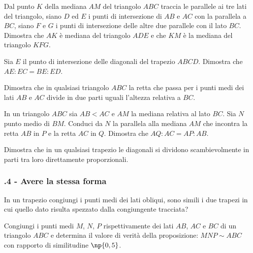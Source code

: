 \begin{multicols}{2}
\begin{esercizio}
\label{ese:6.46}
Dal punto $K$ della mediana $AM$ del triangolo $ABC$ traccia le parallele ai tre lati del triangolo, siano $D$ ed $E$ i punti di intersezione di $AB$ e $AC$ con la parallela a $BC$, siano $F$ e $G$ i punti di intersezione delle altre due parallele con il lato $BC$. Dimostra che $AK$ è mediana del triangolo $ADE$ e che $KM$ è la mediana del triangolo $KFG$.
\end{esercizio}

\begin{esercizio}
\label{ese:6.47}
Sia $E$ il punto di intersezione delle diagonali del trapezio $ABCD$. Dimostra che $AE : EC = BE : ED$.
\end{esercizio}

\begin{esercizio}
\label{ese:6.48}
Dimostra che in qualsiasi triangolo $ABC$ la retta che passa per i punti medi dei lati $AB$ e $AC$ divide in due parti uguali l'altezza relativa a $BC$.
\end{esercizio}

\begin{esercizio}
\label{ese:6.49}
In un triangolo $ABC$ sia $AB<AC$ e $AM$ la mediana relativa al lato $BC$. Sia $N$ punto medio di $BM$. Conduci da $N$ la parallela alla mediana $AM$ che incontra la retta $AB$ in $P$ e la retta $AC$ in $Q$. Dimostra che $AQ : AC = AP : AB$.
\end{esercizio}

\begin{esercizio}
\label{ese:6.50}
Dimostra che in un qualsiasi trapezio le diagonali si dividono scambievolmente in parti tra loro direttamente proporzionali.
\end{esercizio}

\subsubsection*{\thechapter.4 - Avere la stessa forma}

\begin{esercizio}
\label{ese:6.51}
In un trapezio congiungi i punti medi dei lati obliqui, sono simili i due trapezi in cui quello dato risulta spezzato dalla congiungente tracciata? 
\end{esercizio}

\begin{esercizio}
\label{ese:6.52}
Congiungi i punti medi $M$, $N$, $P$ rispettivamente dei lati $AB$, $AC$ e $BC$ di un triangolo $ABC$ e determina il valore di verità della proposizione: $MNP\sim ABC$ con rapporto di similitudine $\np{0,5}$.
\end{esercizio}


\end{multicols}
